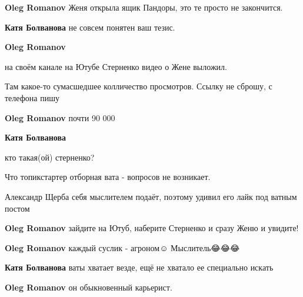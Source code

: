 \begin{itemize}
\begin{itemize}
\textbf{Oleg Romanov} Женя открыла ящик Пандоры, это те просто не закончится.


\textbf{Катя Болванова} не совсем понятен ваш тезис.


\textbf{Oleg Romanov} 

на своём канале на Ютубе Стерненко видео о Жене выложил. 

Там какое-то сумасшедшее колличество просмотров. Ссылку не сброшу, с телефона пишу



\textbf{Oleg Romanov} почти 90 000


\textbf{Катя Болванова} 

кто такая(ой) стерненко?

Что топикстартер отборная вата - вопросов не возникает.

Александр Щерба себя мыслителем подаёт, поэтому удивил его лайк под ватным
постом



\textbf{Oleg Romanov} зайдите на Ютуб, наберите Стерненко и сразу Женю и увидите!


\textbf{Oleg Romanov} каждый суслик - агроном☺️
Мыслитель😂😂😂


\textbf{Катя Болванова} ваты хватает везде, ещё не хватало ее специально искать


\textbf{Oleg Romanov} он обыкновенный карьерист.


\end{itemize}
\end{itemize}
